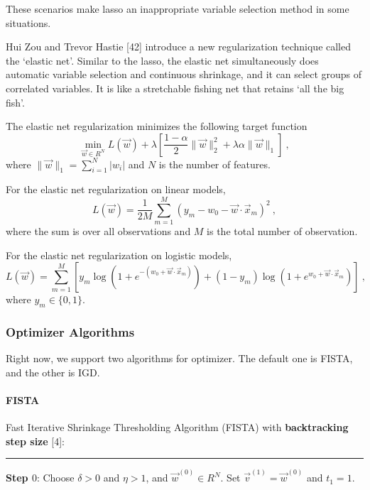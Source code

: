 These scenarios make lasso an inappropriate variable selection method in some situations.

Hui Zou and Trevor Hastie [42] introduce a new regularization
technique called the `elastic net'. Similar to the lasso, the elastic net
simultaneously does automatic variable selection and continuous
shrinkage, and it can select groups of correlated variables. It is like a
stretchable fishing net that retains `all the big fish'.

The elastic net regularization minimizes the following target function
\begin{equation} \label{eq:target}
\min_{\vec{w} \in R^N}L(\vec{w}) + \lambda \left[\frac{1-\alpha}{2}\|\vec{w}\|_2^2 +
  \lambda\alpha \|\vec{w}\|_1\right]\ ,
\end{equation}
where $\|\vec{w}\|_1 = \sum_{i=1}^N|w_i|$ and $N$ is the number of features.

For the elastic net regularization on linear models,
\begin{equation}
L(\vec{w}) = \frac{1}{2M}\sum_{m=1}^M\left(y_m - w_0 - \vec{w} \cdot
  \vec{x}_m\right)^2\ ,
\end{equation}
where the sum is over all observations and $M$ is the total number of
observation.

For the elastic net regularization on logistic models,
\begin{equation}
L(\vec{w}) = \sum_{m=1}^M\left[y_m \log\left(1 + e^{-(w_0 +
      \vec{w}\cdot\vec{x}_m)}\right) + (1-y_m) \log\left(1 + e^{w_0 +
      \vec{w}\cdot\vec{x}_m}\right)\right]\ ,
\end{equation}
where $y_m \in \{0,1\}$.

\subsubsection{Optimizer Algorithms}
Right now, we support two algorithms for optimizer. The default one is
FISTA, and the other is IGD.

\paragraph{FISTA}

Fast Iterative Shrinkage Thresholding Algorithm (FISTA) with {\bf
  backtracking step size} [4]:
\vspace{0.2in}
\hrule
\vspace{0.2in}
{\bf Step $0$}: Choose $\delta>0$ and $\eta > 1$, and
$\vec{w}^{(0)} \in R^N$. Set $\vec{v}^{(1)}=\vec{w}^{(0)}$ and
$t_1=1$.

